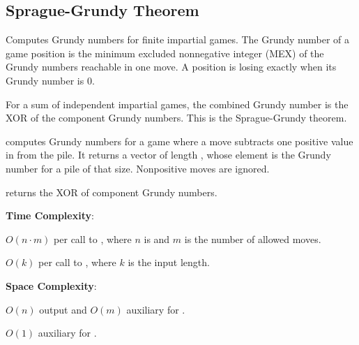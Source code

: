 \subsection{Sprague-Grundy Theorem}
\label{sec:6.8.3}
Computes Grundy numbers for finite impartial games. The Grundy number of a game position is the minimum excluded nonnegative integer (MEX) of the Grundy numbers reachable in one move. A position is losing exactly when its Grundy number is $0$.

For a sum of independent impartial games, the combined Grundy number is the XOR of the component Grundy numbers. This is the Sprague-Grundy theorem.

\begin{compactitem}
  \item {} computes Grundy numbers for a game where a move subtracts one positive value in  from the pile. It returns a vector of length , whose element  is the Grundy number for a pile of that size. Nonpositive moves are ignored.
  \item {} returns the XOR of component Grundy numbers.
\end{compactitem}

\textbf{Time Complexity}:
\begin{compactitem}
  \item $O(n \cdot m)$ per call to , where $n$ is  and $m$ is the number of allowed moves.
  \item $O(k)$ per call to , where $k$ is the input length.
\end{compactitem}

\textbf{Space Complexity}:
\begin{compactitem}
  \item $O(n)$ output and $O(m)$ auxiliary for .
  \item $O(1)$ auxiliary for .
\end{compactitem}

